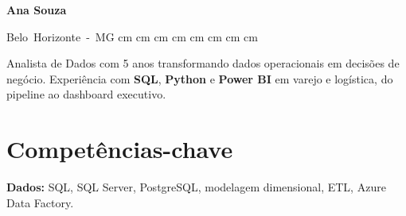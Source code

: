 \newcommand{\cvnome}{Ana Souza}
\newcommand{\cvrodape}{Página \thepage{} de \pageref*{LastPage}}


    \begin{header}
        \textbf{\fontsize{24 pt}{24 pt}\selectfont Ana Souza}

        \vspace{0.3 cm}

        \normalsize
        \mbox{{\color{black}\footnotesize\faMapMarker*}\hspace*{0.13cm}Belo Horizonte - MG}%
         cm%
        \AND%
         cm%
        \mbox{}%
         cm%
        \AND%
         cm%
        \mbox{}%
         cm%
        \AND%
         cm%
        \mbox{}%
         cm%
        \AND%
         cm%
        \mbox{}%
    \end{header}

    \vspace{0.3 cm - 0.3 cm}

    \begin{onecolentry}
        Analista de Dados com 5 anos transformando dados operacionais em decisões de negócio. Experiência com \textbf{SQL}, \textbf{Python} e \textbf{Power BI} em varejo e logística, do pipeline ao dashboard executivo.
    \end{onecolentry}

    \vspace{0.25 cm}

    \section{Competências-chave}
        \begin{onecolentry}
            \textbf{Dados:} SQL, SQL Server, PostgreSQL, modelagem dimensional, ETL, Azure Data Factory.
        \end{onecolentry}

